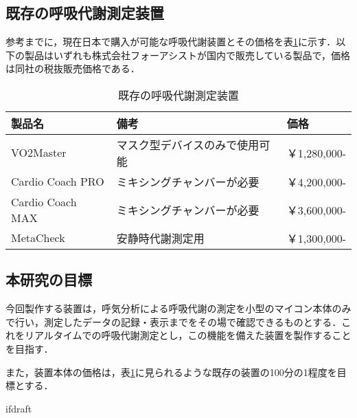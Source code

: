 \subsection{既存の呼吸代謝測定装置}

参考までに，現在日本で購入が可能な呼吸代謝装置とその価格を表\ref{tb:existing_rmmd}に示す．以下の製品はいずれも株式会社フォーアシストが国内で販売している製品で，価格は同社の税抜販売価格である．

\begin{table}[]
\begin{center}
  \caption{既存の呼吸代謝測定装置}
  \label{tb:existing_rmmd}
  \begin{tabular}{|l|l|l|}
  \hline
  製品名              & 備考              & 価格          \\ \hline
  VO2Master        & マスク型デバイスのみで使用可能 & ￥1,280,000- \\ \hline
  Cardio Coach PRO & ミキシングチャンバーが必要   & ￥4,200,000- \\ \hline
  Cardio Coach MAX & ミキシングチャンバーが必要   & ￥3,600,000- \\ \hline
  MetaCheck        & 安静時代謝測定用        & ￥1,300,000- \\ \hline
  \end{tabular}
\end{center}
\end{table}

\subsection{本研究の目標}

今回製作する装置は，呼気分析による呼吸代謝の測定を小型のマイコン本体のみで行い，測定したデータの記録・表示までをその場で確認できるものとする．これをリアルタイムでの呼吸代謝測定とし，この機能を備えた装置を製作することを目指す．

また，装置本体の価格は，表\ref{tb:existing_rmmd}に見られるような既存の装置の100分の1程度を目標とする．


\expandafter\ifx\csname ifdraft\endcsname\relax
  
\fi
